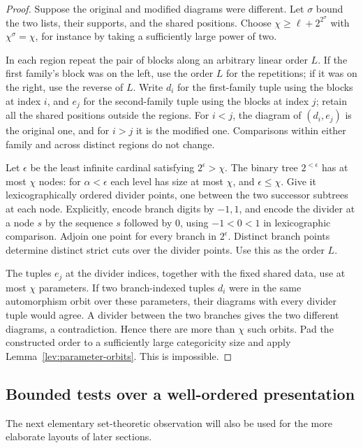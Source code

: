 \begin{proof}
Suppose the original and modified diagrams were different. Let
\(\sigma\) bound the two lists, their supports, and the shared
positions. Choose \(\chi\ge\ell+2^{2^\sigma}\) with
\(\chi^\sigma=\chi\), for instance by taking a sufficiently
large power of two.

In each region repeat the pair of blocks along an arbitrary
linear order \(L\). If the first family's block was on the left,
use the order \(L\) for the repetitions; if it was on the right,
use the reverse of \(L\). Write \(d_i\) for the first-family
tuple using the blocks at index \(i\), and \(e_j\) for the
second-family tuple using the blocks at index \(j\); retain all
the shared positions outside the regions. For \(i<j\), the
diagram of \((d_i,e_j)\) is the original one, and for \(i>j\)
it is the modified one. Comparisons within either family and
across distinct regions do not change.

Let \(\epsilon\) be the least infinite cardinal satisfying
\(2^\epsilon>\chi\). The binary tree \(2^{<\epsilon}\) has
at most \(\chi\) nodes: for \(\alpha<\epsilon\) each level has
size at most \(\chi\), and \(\epsilon\le\chi\). Give it
lexicographically ordered divider points, one between the two
successor subtrees at each node. Explicitly, encode branch
digits by \(-1,1\), and encode the divider at a node \(s\)
by the sequence \(s\) followed by \(0\), using
\(-1<0<1\) in lexicographic comparison. Adjoin one point for every
branch in \(2^\epsilon\). Distinct branch points determine
distinct strict cuts over the divider points. Use this as the
order \(L\).

The tuples \(e_j\) at the divider indices, together with the
fixed shared data, use at most \(\chi\) parameters. If two
branch-indexed tuples \(d_i\) were in the same automorphism
orbit over these parameters, their diagrams with every divider
tuple would agree. A divider between the two branches gives
the two different diagrams, a contradiction. Hence there are
more than \(\chi\) such orbits. Pad the constructed order to a
sufficiently large categoricity size and apply
Lemma~\ref{lev:parameter-orbits}. This is impossible.
\end{proof}

\subsection{Bounded tests over a well-ordered presentation}

The next elementary set-theoretic observation will also be used for
the more elaborate layouts of later sections.

